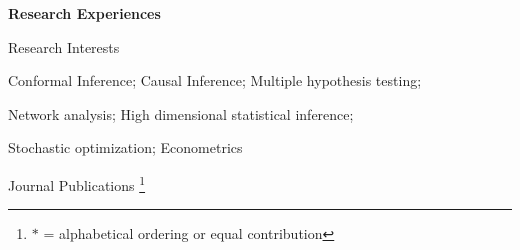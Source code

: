 \documentclass{article}
\begin{document}

\vspace{5mm}
\begin{large}
\noindent \textbf{Research Experiences}
\end{large}
\vspace{5mm}

\begin{large}
\noindent Research Interests
\end{large}

\vspace{3mm}
Conformal Inference; Causal Inference; Multiple hypothesis testing;

Network analysis; High dimensional statistical inference; 

Stochastic optimization; Econometrics

\vspace{3mm}

\clearpage
\begin{large}
\noindent Journal Publications \footnote{$\ast$ = alphabetical ordering or equal contribution}
\end{large}
\end{document}
